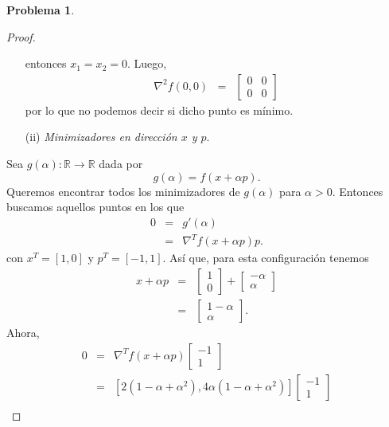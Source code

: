 \documentclass[12pt,letterpaper]{article}
\theoremstyle{definition}
\newtheorem{problm}{Problema}
\begin{document}
\begin{problm}
\begin{proof}
\begin{itemize}
\begin{equation}
			\end{equation}
			entonces $ x_1 = x_2 = 0 $. Luego,
			\begin{eqnarray}
				\nabla^2 f(0, 0) & = & \left[\begin{matrix}
					0 & 0 \\
					0   & 0
				\end{matrix}\right]
			\end{eqnarray} 
			por lo que no podemos decir si dicho punto es mínimo.
			\item[(ii)] \textit{Minimizadores en dirección $ x $ y $ p $}.
		\end{itemize}
		Sea $ g(\alpha): \mathbb{R} \to \mathbb{R}$ dada por 
		\[ g(\alpha) = f(x + \alpha p). \]
		Queremos encontrar todos los minimizadores de $ g(\alpha) $ para $ \alpha > 0 $. Entonces buscamos aquellos puntos en los que 
		\begin{eqnarray*}
			0 & = & g'(\alpha) \\
			  & = & \nabla^T f(x + \alpha p) p.
		\end{eqnarray*}
		con $ x^T = [1, 0] $ y $ p^T = [-1,1] $. Así que, para esta configuración tenemos
		\begin{eqnarray*}
			x + \alpha p & = & \left[\begin{matrix}
									1 \\
									0
							   \end{matrix}\right]
						   		+
						   		\left[\begin{matrix}
						   			-\alpha \\
						   			\alpha
						   		\end{matrix}\right] \\
					     & = & \left[\begin{matrix}
							     	1 - \alpha \\
							     	\alpha
							   \end{matrix}\right].
		\end{eqnarray*}
		Ahora,
		\begin{eqnarray*}
			0 & = & \nabla^T f(x + \alpha p) \left[\begin{matrix}
								-1 \\
								1
			\end{matrix}\right] \\
			  & = & [ 2 (1 -\alpha + \alpha^2), 4 \alpha  (1 -\alpha + \alpha^2) ]
			  		\left[\begin{matrix}
			  			-1 \\
			  			1
			  		\end{matrix}\right] \\

\end{eqnarray*}
\end{proof}
\end{problm}
\end{document}
